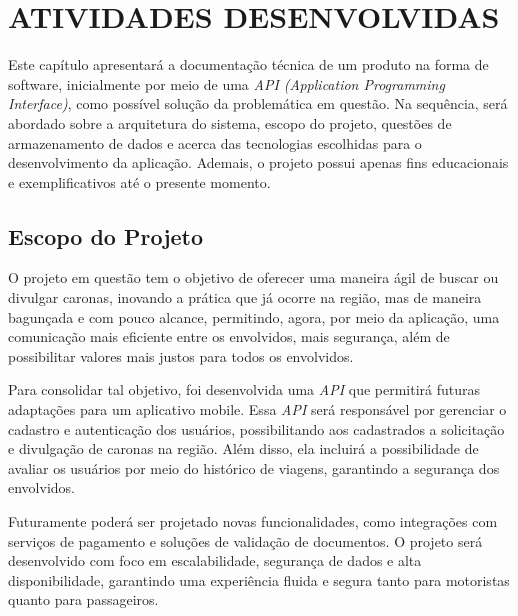 \chapter{ATIVIDADES DESENVOLVIDAS}

Este capítulo apresentará a documentação técnica de um produto na forma de software, inicialmente por meio de uma \textit{API (Application Programming Interface)}, como possível solução da problemática em questão. Na sequência, será abordado sobre a arquitetura do sistema, escopo do projeto, questões de armazenamento de dados e acerca das tecnologias escolhidas para o desenvolvimento da aplicação. Ademais, o projeto possui apenas fins educacionais e exemplificativos até o presente momento.

\section{Escopo do Projeto}

O projeto em questão tem o objetivo de oferecer uma maneira ágil de buscar ou divulgar caronas, inovando a prática que já ocorre na região, mas de maneira bagunçada e com pouco alcance, permitindo, agora, por meio da aplicação, uma comunicação mais eficiente entre os envolvidos, mais segurança, além de possibilitar valores mais justos para todos os envolvidos. 

Para consolidar tal objetivo, foi desenvolvida uma \textit{API} que permitirá futuras adaptações para um aplicativo mobile. Essa \textit{API} será responsável por gerenciar o cadastro e autenticação dos usuários, possibilitando aos cadastrados a solicitação e divulgação de caronas na região. Além disso, ela incluirá a possibilidade de avaliar os usuários por meio do histórico de viagens, garantindo a segurança dos envolvidos.

Futuramente poderá ser projetado novas funcionalidades, como integrações com serviços de pagamento e soluções de validação de documentos. O projeto será desenvolvido com foco em escalabilidade, segurança de dados e alta disponibilidade, garantindo uma experiência fluida e segura tanto para motoristas quanto para passageiros.




